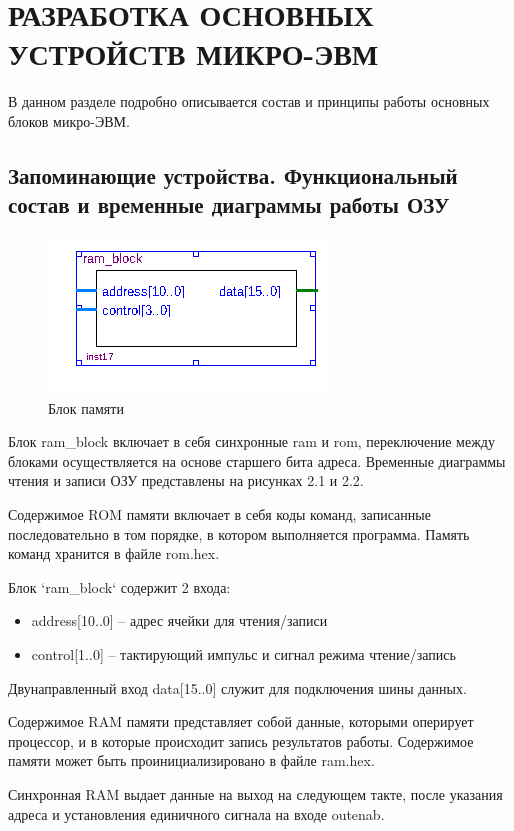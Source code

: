 \section{РАЗРАБОТКА ОСНОВНЫХ УСТРОЙСТВ МИКРО-ЭВМ}

В данном разделе подробно описывается состав и принципы работы основных блоков микро-ЭВМ.

\subsection{Запоминающие устройства. Функциональный состав и временные диаграммы работы ОЗУ}

\begin{figure}[ht]
\centering
        \includegraphics[scale=0.8]{ramb}
    \caption{Блок памяти}
\end{figure}
Блок ram\_block включает в себя синхронные ram и rom, переключение между блоками осуществляется на основе старшего бита адреса.
Временные диаграммы чтения и записи ОЗУ представлены на рисунках 2.1 и 2.2.

Содержимое ROM памяти включает в себя коды команд, записанные последовательно в том порядке, в котором выполняется программа.
Память команд хранится в файле rom.hex.

Блок `ram\_block` содержит 2 входа:
\begin{itemize}
    \item address[10..0] -- адрес ячейки для чтения/записи
    \item control[1..0] -- тактирующий импульс и сигнал режима чтение/запись
\end{itemize}
Двунаправленный вход data[15..0] служит для подключения шины данных.

Содержимое RAM памяти представляет собой данные, которыми оперирует процессор, и в которые происходит запись результатов работы. Содержимое памяти может быть проинициализировано в файле ram.hex.

Синхронная RAM выдает данные на выход на следующем такте, после указания адреса и установления единичного сигнала на входе outenab.

